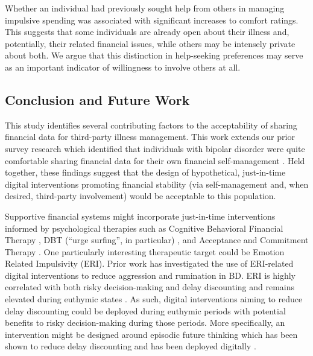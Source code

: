 \documentclass[10pt]{article}
\begin{document}
Whether an individual had previously sought help from others in managing impulsive spending was associated with significant increases to comfort ratings. This suggests that some individuals are already open about their illness and, potentially, their related financial issues, while others may be intensely private about both. We argue that this distinction in help-seeking preferences may serve as an important indicator of willingness to involve others at all.

\subsection{Conclusion and Future Work}

This study identifies several contributing factors to the acceptability of sharing financial data for third-party illness management. This work extends our prior survey research which identified that individuals with bipolar disorder were quite comfortable sharing financial data for their own financial self-management \cite{brozenasupportive2024}. Held together, these findings suggest that the design of hypothetical, just-in-time digital interventions promoting financial stability (via self-management and, when desired, third-party involvement) would be acceptable to this population.

Supportive financial systems might incorporate just-in-time interventions informed by psychological therapies such as Cognitive Behavioral Financial Therapy \cite{klontzfinancial2015}, DBT (``urge surfing'', in particular) \cite{reinharthEffects}, and Acceptance and Commitment Therapy \cite{el-sayedefficacy2023, kroskaoptimizing2020, wadaacceptance2015}. One particularly interesting therapeutic target could be Emotion Related Impulsivity (ERI). Prior work has investigated the use of ERI-related digital interventions to reduce aggression \cite{johnsondevelopment2020} and rumination \cite{allencognitive2025} in BD. ERI is highly correlated with both risky decision-making and delay discounting \cite{elliottemotionrelated2023} and remains elevated during euthymic states \cite{johnsonEmotionRelated2018}. As such, digital interventions aiming to reduce delay discounting could be deployed during euthymic periods with potential benefits to risky decision-making during those periods. More specifically, an intervention might be designed around episodic future thinking which has been shown to reduce delay discounting \cite{rungexperimental2018, scholtenBehavioral2019} and has been deployed digitally \cite{perssonepisodic2023}.
\end{document}

